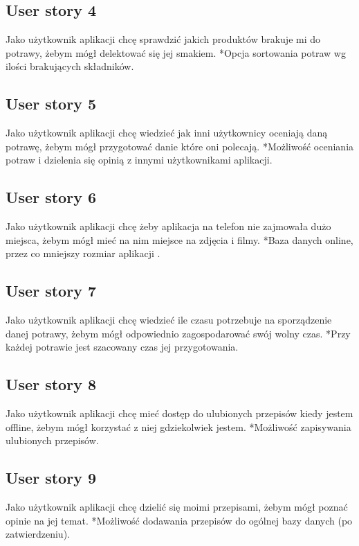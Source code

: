 \documentclass[a4paper]{article}
\begin{document}
\subsection{User story 4}
Jako użytkownik aplikacji chcę sprawdzić jakich produktów brakuje mi do potrawy, żebym mógł delektować się jej smakiem. \newline
*Opcja sortowania potraw wg ilości brakujących składników.

\subsection{User story 5}
Jako użytkownik aplikacji chcę wiedzieć jak inni użytkownicy oceniają daną potrawę, żebym mógł przygotować danie które oni polecają. \newline
*Możliwość oceniania potraw i dzielenia się opinią z innymi użytkownikami aplikacji.

\subsection{User story 6}
Jako użytkownik aplikacji chcę żeby aplikacja na telefon nie zajmowała dużo miejsca, żebym mógł mieć na nim miejsce na zdjęcia i filmy. \newline
*Baza danych online, przez co mniejszy rozmiar aplikacji .

\subsection{User story 7}
Jako użytkownik aplikacji chcę wiedzieć ile czasu potrzebuje na sporządzenie danej potrawy, żebym mógł odpowiednio zagospodarować swój wolny czas. \newline
*Przy każdej potrawie jest szacowany czas jej przygotowania.

\subsection{User story 8}
Jako użytkownik aplikacji chcę mieć dostęp do ulubionych przepisów kiedy jestem offline, żebym mógł korzystać z niej gdziekolwiek jestem. \newline
*Możliwość zapisywania ulubionych przepisów.

\subsection{User story 9}
Jako użytkownik aplikacji chcę dzielić się moimi przepisami, żebym mógł poznać opinie na jej temat. \newline
*Możliwość dodawania przepisów do ogólnej bazy danych (po zatwierdzeniu).
\end{document}
